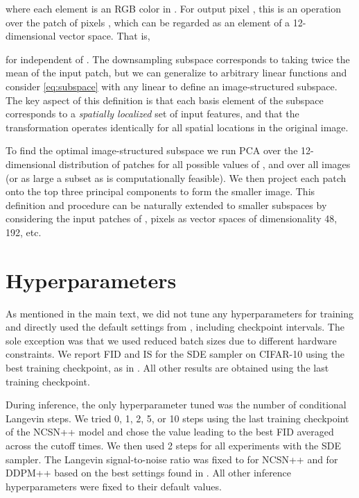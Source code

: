 \documentclass{article}
\begin{document}
where each element  is an RGB color in . For output pixel , this is an operation over the  patch of pixels , which can be regarded as an element of a 12-dimensional vector space. That is,

for  independent of . The downsampling subspace corresponds to taking twice the mean of the input patch, but we can generalize to arbitrary linear functions and consider \eqref{eq:subspace} with any linear  to define an image-structured subspace. The key aspect of this definition is that each basis element of the subspace corresponds to a \emph{spatially localized} set of input features, and that the transformation operates identically for all spatial locations in the original image.

To find the optimal  image-structured subspace we run PCA over the 12-dimensional distribution of patches  for all possible values of , and over all images (or as large a subset as is computationally feasible). We then project each patch onto the top three principal components to form the smaller image. This definition and procedure can be naturally extended to smaller subspaces by considering the input patches of ,  pixels as vector spaces of dimensionality 48, 192, etc.

\section{Hyperparameters} \label{appendix:hyperparameters}

As mentioned in the main text, we did not tune any hyperparameters for training and directly used the default settings from \cite{song2021score}, including checkpoint intervals. The sole exception was that we used reduced batch sizes due to different hardware constraints. We report FID and IS for the SDE sampler on CIFAR-10 using the best training checkpoint, as in \cite{song2021score}. All other results are obtained using the last training checkpoint.

During inference, the only hyperparameter tuned was the number of conditional Langevin steps. We tried 0, 1, 2, 5, or 10 steps using the last training checkpoint of the  NCSN++ model and chose the value leading to the best FID averaged across the cutoff times. We then used 2 steps for all experiments with the SDE sampler. The Langevin signal-to-noise ratio was fixed to  for NCSN++ and  for DDPM++ based on the best settings found in \cite{song2021score}. All other inference hyperparameters were fixed to their default values.
\end{document}
